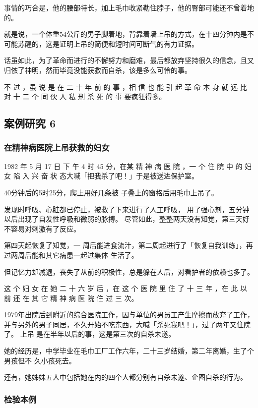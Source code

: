 \documentclass[UTF8]{ctexart}
\begin{document}
事情的巧合是，他的腰部特长，加上毛巾收紧勒住脖子，他的臀部可能还不曾着地的。

就是说，一个体重$54$公斤的男子脚着地，背靠着墙上吊的方式，在十四分钟内是不可能苏醒的，这是证明上吊的简便和短时间可断气的有力证据。

话虽如此，为了革命而进行的不懈努力和磨难，最后都放弃坚持很久的信念，且又归依了神明，然而毕竟没能获救而自杀，该是多么可怜的事。

不 过 ，虽 说 是 在 二 十 年 前 的 事 ，相 信 也 能 引 起 革 命 本 身 就 远 比 对 十 二 个 同 伙 人 私 刑 杀 死 的 事 要疯狂得多。

\subsection{案例研究 6}
\subsubsection*{在精神病医院上吊获救的妇女}

1982 年 5 月 17 日 下 午 4 时 45 分，在某 精 神 病 医 院 ，一 个 住 院 中 的 妇 女 陷 入 兴 奋 状 态大喊「把我杀了吧！」于是被送进保护室。

$40$分钟后的5时25分，爬上用好几条被 子叠上的窗格后用毛巾上吊了。

发现时呼吸、心脏都已停止，被救了下来进行了人工呼吸， 用了强心剂，五分钟以后出现了自发性呼吸和微弱的脉搏。 尽管如此，整整两天没有知觉，第三天好不容易对刺激有了反应。

第四天起恢复了知觉，一 周后能进食流汁，第二周起进行了「恢复自我训练」，再过两周后能和其它病患一起过集体 生活了。

但记忆力却减退，丧失了从前的积极性，总是躲在人后，对看护者的依赖也多了。

这 个 妇 女 在 她 二 十 六 岁 后 ，在 这 个 医 院 里 住 了 十 三 年 ，在 此 以 前 还 在 其 它 精 神 病 医 院 住 过 三 次。

1979年出院后到附近的综合医院工作，因与单位的男员工产生摩擦而放弃了工作， 并与另外的男子同居，不久开始不吃东西，大喊「杀死我吧！」，过了两年又住院了。
上吊 是在半年以后的事，这是第三次的自杀未遂。

她的经历是，中学毕业在毛巾工厂工作六年，二十三岁结婚，第二年离婚，生了个男孩但不 久小孩死去。

还有，她姊妹五人中包括她在内的四个人都分别有自杀未遂、企图自杀的行为。

\subsubsection*{检验本例}
\end{document}

